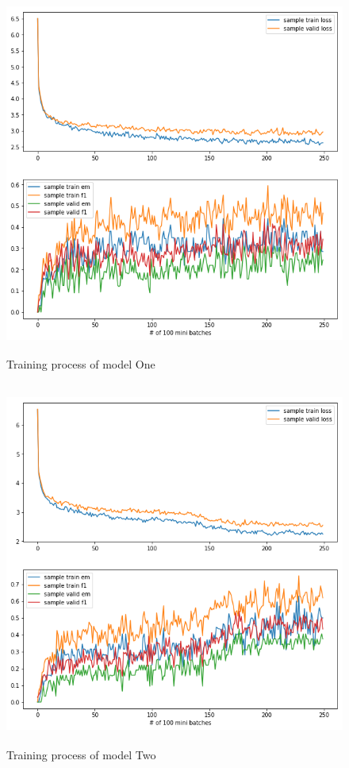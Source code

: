 \documentclass[modernstyle,12pt]{sjsuthesis}
\theoremstyle{definition}
\begin{document}
\begin{figure}[htbp]\centering
  \includegraphics[width=12cm, height=12cm]{figures/match_corrected.png}
  \caption{Training process of model One}
  \label{f:mlap}
\end{figure}

\begin{figure}[htbp]\centering
  \includegraphics[width=12cm, height=12cm]{figures/match_baseline.png}
  \caption{Training process of model Two}
  \label{f:baseline_change0}
\end{figure}
\end{document}
